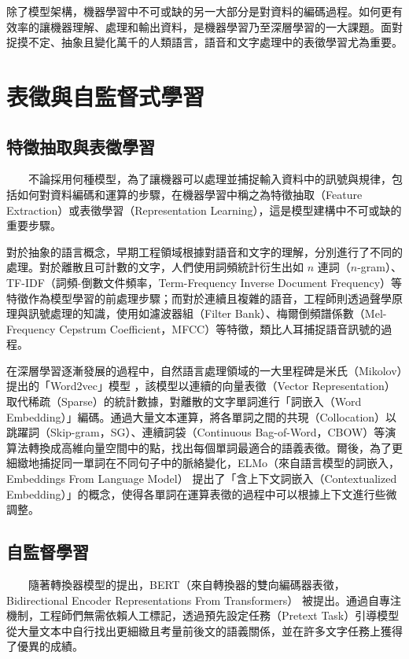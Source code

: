         除了模型架構，機器學習中不可或缺的另一大部分是對資料的編碼過程。如何更有效率的讓機器理解、處理和輸出資料，是機器學習乃至深層學習的一大課題。面對捉摸不定、抽象且變化萬千的人類語言，語音和文字處理中的表徵學習尤為重要。

\section{表徵與自監督式學習}

\subsection{特徵抽取與表徵學習}

　　不論採用何種模型，為了讓機器可以處理並捕捉輸入資料中的訊號與規律，包括如何對資料編碼和運算的步驟，在機器學習中稱之為特徵抽取（Feature Extraction）或表徵學習（Representation Learning），這是模型建構中不可或缺的重要步驟。

        對於抽象的語言概念，早期工程領域根據對語音和文字的理解，分別進行了不同的處理。對於離散且可計數的文字，人們使用詞頻統計衍生出如 \(n\) 連詞（\(n\)-gram）、TF-IDF（詞頻-倒數文件頻率，Term-Frequency Inverse Document Frequency）等特徵作為模型學習的前處理步驟；而對於連續且複雜的語音，工程師則透過聲學原理與訊號處理的知識，使用如濾波器組（Filter Bank）、梅爾倒頻譜係數（Mel-Frequency Cepstrum Coefficient，MFCC）等特徵，類比人耳捕捉語音訊號的過程。

        在深層學習逐漸發展的過程中，自然語言處理領域的一大里程碑是米氏（Mikolov）提出的「Word2vec」模型 \cite{mikolov_efficient_2013}，該模型以連續的向量表徵（Vector Representation）取代稀疏（Sparse）的統計數據，對離散的文字單詞進行「詞嵌入（Word Embedding）」編碼。通過大量文本運算，將各單詞之間的共現（Collocation）以跳躍詞（Skip-gram，SG）、連續詞袋（Continuous Bag-of-Word，CBOW）等演算法轉換成高維向量空間中的點，找出每個單詞最適合的語義表徵。爾後，為了更細緻地捕捉同一單詞在不同句子中的脈絡變化，ELMo（來自語言模型的詞嵌入，Embeddings From Language Model）\cite{peters_deep_2018} 提出了「含上下文詞嵌入（Contextualized Embedding）」的概念，使得各單詞在運算表徵的過程中可以根據上下文進行些微調整。

\subsection{自監督學習}

　　隨著轉換器模型的提出，BERT（來自轉換器的雙向編碼器表徵，Bidirectional Encoder Representations From Transformers）\cite{devlin_bert_2019} 被提出。通過自專注機制，工程師們無需依賴人工標記，透過預先設定任務（Pretext Task）引導模型從大量文本中自行找出更細緻且考量前後文的語義關係，並在許多文字任務上獲得了優異的成績。

